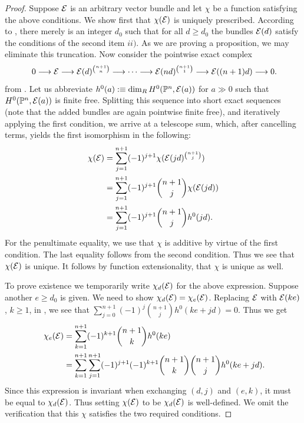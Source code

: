 \begin{proof}
  Suppose $\mathcal{E}$ is an arbitrary vector bundle and let $\chi$ be a function satisfying the above conditions.
  We show first that $\chi(\mathcal{E})$ is uniquely prescribed.
  According to , there merely is an integer $d_0$ such that for all $d \geq d_0$ the bundles $\mathcal{E}(d)$ satisfy the conditions of the second item $ii)$.
  As we are proving a proposition, we may eliminate this truncation.
  Now consider the pointwise exact complex
  \[
    0 \longrightarrow \mc E
      \longrightarrow \mc E(d)^{\binom{n+1}{n}}
      \longrightarrow \cdots
      \longrightarrow \mc E(nd)^{\binom{n+1}{1}}
      \longrightarrow \mc E((n+1)d)
      \longrightarrow 0
      \rlap{.}
  \]
  from .
Let us abbreviate $h^0(a) :\equiv \dim_R H^0(\mathbb{P}^n,\mathcal{E}(a))$ for $a \gg 0$ such that $H^0(\mathbb{P}^n, \mathcal{E}(a))$ is finite free.
  Splitting this sequence into short exact sequences (note that the added bundles are again pointwise finite free), and iteratively applying the first condition, we arrive at a telescope sum, which, after cancelling terms, yields the first isomorphism in the following:
  \begin{align*}
    \chi(\mc E) &= \sum_{j=1}^{n+1} (-1)^{j+1} \chi(\mc E(jd)^{\binom{n+1}{j}}) \\
                &= \sum_{j=1}^{n+1} (-1)^{j+1} \binom{n+1}{j} \chi(\mc E(jd)) \\
                &= \sum_{j=1}^{n+1} (-1)^{j+1} \binom{n+1}{j} h^0(jd)
    \rlap{.}
  \end{align*}
  For the penultimate equality, we use that $\chi$ is additive by virtue of the first condition.
  The last equality follows from the second condition.
  Thus we see that $\chi(\mathcal{E})$ is unique.
  It follows by function extensionality, that $\chi$ is unique as well.

  To prove existence we temporarily write $\chi_d(\mathcal{E})$ for the above expression.
  Suppose another $e \geq d_0$ is given.
  We need to show $\chi_d(\mathcal{E}) = \chi_e(\mathcal{E})$.
  Replacing $\mathcal{E}$ with $\mathcal{E}(ke)$, $k \geq 1$, in , we see that $\sum_{j=0}^{n+1}(-1)^j\binom{n+1}{j}h^0(ke+jd) = 0$.
  Thus we get
  \begin{align*}
    \chi_e(\mc E) &= \sum_{k=1}^{n+1} (-1)^{k+1} \binom{n+1}{k} h^0(ke) \\
                  &= \sum_{k=1}^{n+1} \sum_{j=1}^{n+1}(-1)^{j+1}(-1)^{k+1} \binom{n+1}{k} \binom{n+1}{j} h^0(ke+jd) \rlap{.}
  \end{align*}
  Since this expression is invariant when exchanging $(d,j)$ and $(e,k)$, it must be equal to $\chi_d(\mathcal{E})$.
  Thus setting $\chi(\mathcal{E})$ to be $\chi_d(\mathcal{E})$ is well-defined.
  We omit the verification that this $\chi$ satisfies the two required conditions.
\end{proof}


